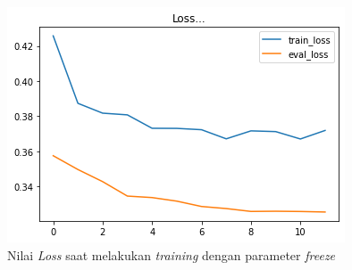 \begin{figure}[h]
    \begin{center}
        \includegraphics[width= 0.9\linewidth]{gambar/loss_freeze_new.png}
        \caption{Nilai \textit{Loss} saat melakukan \textit{training} dengan parameter \textit{freeze}}
        \label{fig: loss_freeze}
    \end{center}
\end{figure}

